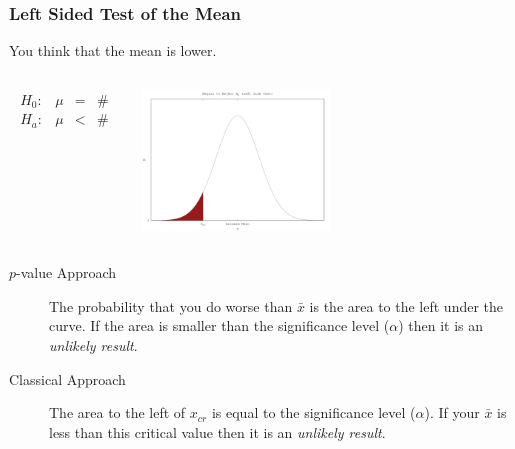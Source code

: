 \begin{frame}
  \frametitle{Left Sided Test of the Mean}

  You think that the mean is lower.

  \begin{columns}
    \begin{eqnarray*}
      \begin{array}{lrcl}
        H_0: & \mu & = & \# \\
        H_a: & \mu & < & \#
      \end{array}
    \end{eqnarray*}


    \includegraphics[width=5cm]{img/leftSideHypothesisTest}

  \end{columns}

  \begin{description}
  \item[$p$-value Approach] The probability that you do worse than
    $\bar{x}$ is the area to the left under the curve. If the area is
    smaller than the significance level ($\alpha$) then it is an
    \textit{unlikely result}.
  \item[Classical Approach] The area to the left of $x_{cr}$ is
    equal to the significance level ($\alpha$). If your $\bar{x}$ is
    less than this critical value then it is an \textit{unlikely
      result}.
  \end{description}


\end{frame}


